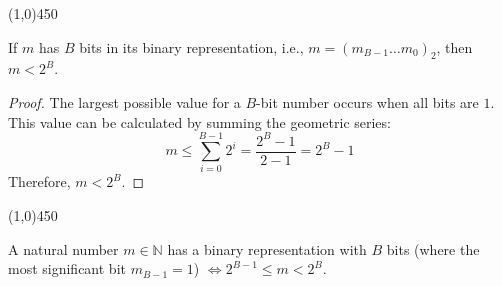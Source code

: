 \begin{center}
    \vspace{10pt}
    \line(1,0){450}
    \vspace{25pt}
\end{center}

\begin{remark}
If $m$ has $B$ bits in its binary representation, i.e., $m = (m_{B-1}\dots m_0)_2$, then $m < 2^B$.
\end{remark}
\begin{proof}
The largest possible value for a $B$-bit number occurs when all bits are $1$. This value can be calculated by summing the geometric series:
$$ m \leq \sum_{i=0}^{B-1} 2^i = \frac{2^B - 1}{2 - 1} = 2^B - 1 $$
Therefore, $m < 2^B$.
\end{proof}

\begin{center}
    \vspace{10pt}
    \line(1,0){450}
    \vspace{25pt}
\end{center}

\begin{corollary}
A natural number $m \in \mathbb{N}$ has a binary representation with $B$ bits (where the most significant bit $m_{B-1} = 1$) $\iff 2^{B-1} \leq m < 2^B$.
\end{corollary}
\bigskip